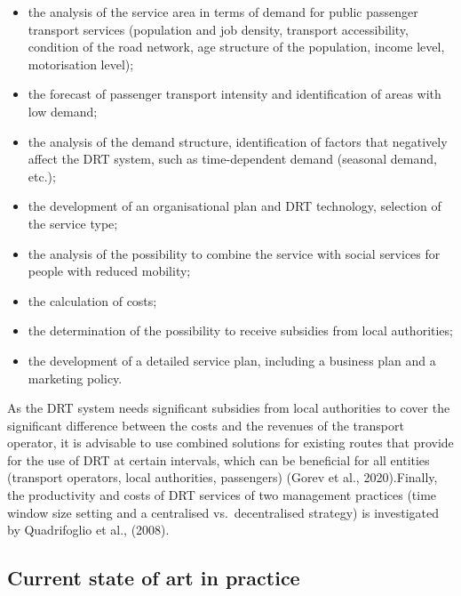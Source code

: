 \documentclass[
]{book}
\providecommand{\tightlist}{%
  \setlength{\itemsep}{0pt}\setlength{\parskip}{0pt}}
\begin{document}
\begin{itemize}
\tightlist
\item
  the analysis of the service area in terms of demand for public passenger transport services (population and job density, transport accessibility, condition of the road network, age structure of the population, income level, motorisation level);
\item
  the forecast of passenger transport intensity and identification of areas with low demand;
\item
  the analysis of the demand structure, identification of factors that negatively affect the DRT system, such as time-dependent demand (seasonal demand, etc.);
\item
  the development of an organisational plan and DRT technology, selection of the service type;
\item
  the analysis of the possibility to combine the service with social services for people with reduced mobility;
\item
  the calculation of costs;
\item
  the determination of the possibility to receive subsidies from local authorities;
\item
  the development of a detailed service plan, including a business plan and a marketing policy.
\end{itemize}

As the DRT system needs significant subsidies from local authorities to cover the significant difference between the costs and the revenues of the transport operator, it is advisable to use combined solutions for existing routes that provide for the use of DRT at certain intervals, which can be beneficial for all entities (transport operators, local authorities, passengers) (Gorev et al., 2020).Finally, the productivity and costs of DRT services of two management practices (time window size setting and a centralised vs.~decentralised strategy) is investigated by Quadrifoglio et al., (2008).

\hypertarget{current-state-of-art-in-practice-27}{%
\subsection*{Current state of art in practice}\label{current-state-of-art-in-practice-27}}
\end{document}
